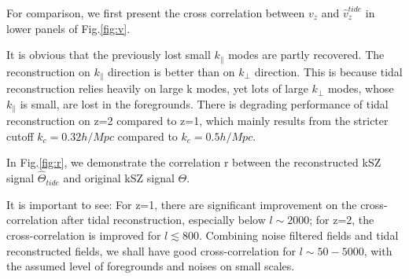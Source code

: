 
For comparison, we first present the cross correlation between $v_z$ and $\hat v_z^{tide}$ in lower panels of Fig.\ref{fig:v}. 

It is obvious that the previously lost small $k_\parallel$ modes are partly recovered. 
The reconstruction on $k_\parallel$ direction is better than on $k_\perp$ direction.
This is because tidal reconstruction relies heavily on large k modes, 
yet lots of large $k_\perp$ modes, whose $k_\parallel$ is small, are lost in the foregrounds. 
There is degrading performance of tidal reconstruction on z=2 compared to z=1, 
which mainly results from the stricter cutoff $k_c=0.32 h/Mpc$ compared to $k_c=0.5 h/Mpc$.

In Fig.\ref{fig:r}, 
we demonstrate the correlation r between the reconstructed kSZ signal $\hat \Theta_{tide}$ and original kSZ signal $\Theta$. 

It is important to see:
For z=1, there are significant improvement on the cross-correlation after tidal reconstruction, especially below $l\sim 2000$; 
for z=2, the cross-correlation is improved for $l\lesssim 800$. 
Combining noise filtered fields and tidal reconstructed fields, we shall have good cross-correlation for $l \sim 50-5000$, 
with the assumed level of foregrounds and noises on small scales.



